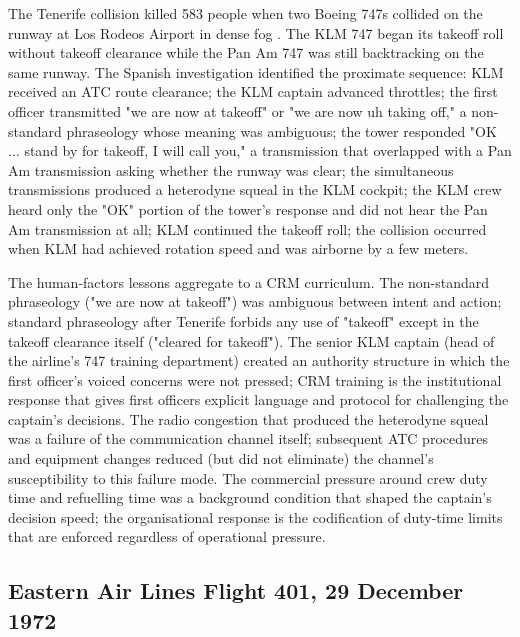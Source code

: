 The Tenerife collision killed 583 people when two Boeing 747s collided on the runway at Los Rodeos Airport in dense fog \cite{acc:ciaiac-tenerife-1978}. The KLM 747 began its takeoff roll without takeoff clearance while the Pan Am 747 was still backtracking on the same runway. The Spanish investigation identified the proximate sequence: KLM received an ATC route clearance; the KLM captain advanced throttles; the first officer transmitted "we are now at takeoff" or "we are now uh taking off," a non-standard phraseology whose meaning was ambiguous; the tower responded "OK $\ldots$ stand by for takeoff, I will call you," a transmission that overlapped with a Pan Am transmission asking whether the runway was clear; the simultaneous transmissions produced a heterodyne squeal in the KLM cockpit; the KLM crew heard only the "OK" portion of the tower's response and did not hear the Pan Am transmission at all; KLM continued the takeoff roll; the collision occurred when KLM had achieved rotation speed and was airborne by a few meters.

The human-factors lessons aggregate to a CRM curriculum. The non-standard phraseology ("we are now at takeoff") was ambiguous between intent and action; standard phraseology after Tenerife forbids any use of "takeoff" except in the takeoff clearance itself ("cleared for takeoff"). The senior KLM captain (head of the airline's 747 training department) created an authority structure in which the first officer's voiced concerns were not pressed; CRM training is the institutional response that gives first officers explicit language and protocol for challenging the captain's decisions. The radio congestion that produced the heterodyne squeal was a failure of the communication channel itself; subsequent ATC procedures and equipment changes reduced (but did not eliminate) the channel's susceptibility to this failure mode. The commercial pressure around crew duty time and refuelling time was a background condition that shaped the captain's decision speed; the organisational response is the codification of duty-time limits that are enforced regardless of operational pressure.

\subsection*{Eastern Air Lines Flight 401, 29 December 1972}

